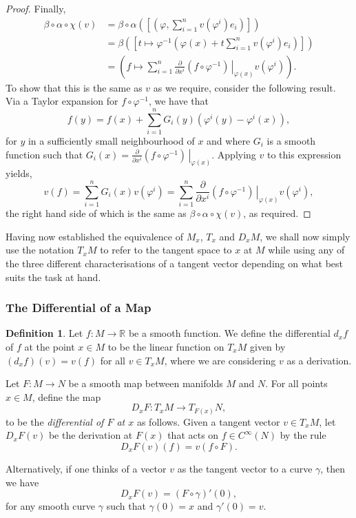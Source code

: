 \documentclass[12pt,a4paper]{article}
\numberwithin{equation}{section}
\theoremstyle{definition}
\newtheorem{definition}{Definition}[section]
\theoremstyle{remark}
\begin{document}
\begin{proof}
Finally,
\begin{align*}
\beta\circ\alpha\circ\chi(v)&=\beta\circ\alpha\left( \left[ \left( \varphi,\sum_{i=1}^{n}v(\varphi^i)e_i \right) \right] \right)\\
&=\beta\left( \left[ t\mapsto \varphi^{-1}\left( \varphi(x)+t\sum_{i=1}^nv(\varphi^i)e_i \right) \right] \right)\\
&=\left( f\mapsto\sum_{i=1}^n\frac{\partial}{\partial x^i}\left.(f\circ\varphi^{-1})\,\right\rvert_{\varphi(x)}v(\varphi^i) \right).
\end{align*}
To show that this is the same as $v$ as we require, consider the following result. Via a Taylor expansion for $f\circ\varphi^{-1}$, we have that
\[
f(y)=f(x)+\sum_{i=1}^nG_i(y)\left(\varphi^i(y)-\varphi^i(x)\right),
\]
for $y$ in a sufficiently small neighbourhood of $x$ and where $G_i$ is a smooth function such that $G_i(x)=\frac{\partial}{\partial x^i}\left. (f\circ\varphi^{-1})\,\right\rvert_{\varphi(x)}$. Applying $v$ to this expression yields,
\begin{equation}
v(f)=\sum_{i=1}^{n}G_i(x)v(\varphi^i)=\sum_{i=1}^n\frac{\partial}{\partial x^i}\left.(f\circ\varphi^{-1})\,\right\rvert_{\varphi(x)}v(\varphi^i),
\label{eq:vf-detail-1}
\end{equation}
the right hand side of which is the same as $\beta\circ\alpha\circ\chi(v)$, as required.
\end{proof}
Having now established the equivalence of $M_x$, $T_x$ and $D_xM$, we shall now simply use the notation $T_xM$ to refer to the tangent space to $x$ at $M$ while using any of the three different characterisations of a tangent vector depending on what best suits the task at hand.
\subsubsection{The Differential of a Map}
\begin{definition}
Let $f:M\to\mathbb{R}$ be a smooth function. We define the differential $d_xf$ of $f$ at the point $x\in M$ to be the linear function on $T_xM$ given by $(d_xf)(v)=v(f)$ for all $v\in T_xM$, where we are considering $v$ as a derivation. 

Let $F:M\to N$ be a smooth map between manifolds $M$ and $N$. For all points $x\in M$, define the map
\[
D_xF:T_xM\to T_{F(x)}N,
\]
to be the \textit{differential of $F$ at $x$} as follows. Given a tangent vector $v\in T_xM$, let $D_xF(v)$ be the derivation at $F(x)$ that acts on $f\in C^{\infty}(N)$ by the rule
\[
D_xF(v)(f)=v(f\circ F).
\]
\end{definition}
Alternatively, if one thinks of a vector $v$ as the tangent vector to a curve $\gamma$, then we have
\[
D_xF(v)=(F\circ\gamma)'(0),
\] 
for any smooth curve $\gamma$ such that $\gamma(0)=x$ and $\gamma'(0)=v$.
\end{document}
